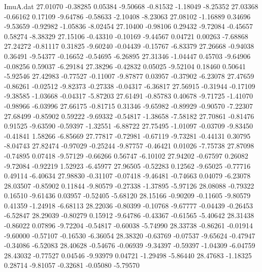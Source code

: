 \begin{filecontents}{ImuA.dat}
  27.01070   -0.38285    0.05384   -9.50668   -0.81532   -1.18049   -8.25352
  27.03368   -0.66162    0.17109   -9.64786   -0.58633   -2.10408   -8.23063
  27.08102   -1.16889    0.34696   -9.53659   -0.92982   -1.05836   -8.02454
  27.10400   -0.98106    0.29432   -9.72084   -0.45657    0.58274   -8.38329
  27.15106   -0.43310   -0.10169   -9.44567    0.04721    0.00263   -7.68868
  27.24272   -0.81117    0.31825   -9.60240   -0.04439   -0.15767   -6.83379
  27.26668   -0.94038    0.36491   -9.54377   -0.16652   -0.54695   -6.26895
  27.31346   -1.04447    0.45703   -9.64906   -0.08256    0.59037   -6.29184
  27.38296   -0.42832    0.05025   -9.52104    0.18460    0.50641   -5.92546
  27.42983   -0.77527   -0.11007   -9.87877    0.03957   -0.37902   -6.23078
  27.47659   -0.86261   -0.02512   -9.82373   -0.27338   -0.04317   -6.36817
  27.56915   -0.31944   -0.17109   -9.38585   -1.03668   -0.04317   -5.87203
  27.61491   -0.85783    0.40678   -9.71725   -1.41070   -0.98966   -6.03996
  27.66175   -0.81715    0.31346   -9.65982   -0.89929   -0.90570   -7.22307
  27.68499   -0.85902    0.59222   -9.69332   -0.54817   -1.38658   -7.58182
  27.70861   -0.81476    0.91525   -9.63590   -0.59397   -1.32551   -6.88722
  27.75495   -1.01097   -0.03709   -9.83450   -0.41841    1.58266   -6.85669
  27.77817   -0.72981   -0.67119   -9.73281   -0.44131    0.30795   -8.04743
  27.82474   -0.97029   -0.25244   -9.87757   -0.46421    0.01026   -7.75738
  27.87098   -0.74895    0.07418   -9.57129   -0.66266    0.56747   -6.10102
  27.94202   -0.67597    0.26082   -9.72084   -0.92219    1.52923   -6.45977
  27.96505   -0.52283    0.12562   -9.65025   -0.77716    0.49114   -6.40634
  27.98830   -0.31107   -0.07418   -9.46481   -0.74663    0.04079   -6.23078
  28.03507   -0.85902    0.11844   -9.80579   -0.27338   -1.37895   -5.97126
  28.08088   -0.79322    0.16510   -9.61436    0.03957   -0.52405   -5.68120
  28.15166   -0.90209   -0.11605   -9.80579    0.41359   -1.24918   -6.68113
  28.22036   -0.80399   -0.10768   -9.67777   -0.04439   -0.26453   -6.52847
  28.29039   -0.80279    0.15912   -9.64786   -0.43367   -0.61565   -5.40642
  28.31438   -0.86022    0.07896   -9.72204   -0.54817   -0.60038   -5.74990
  28.33738   -0.86261   -0.01914   -9.60000   -0.57107   -0.16530   -6.36054
  28.38320   -0.63769   -0.07537   -9.65624   -0.47947   -0.34086   -6.52083
  28.40628   -0.54676   -0.06939   -9.34397   -0.59397   -1.04309   -6.04759
  28.43032   -0.77527    0.04546   -9.93979    0.04721   -1.29498   -5.86440
  28.47683   -1.18325    0.28714   -9.81057   -0.32681   -0.05080   -5.79570

\end{filecontents}

